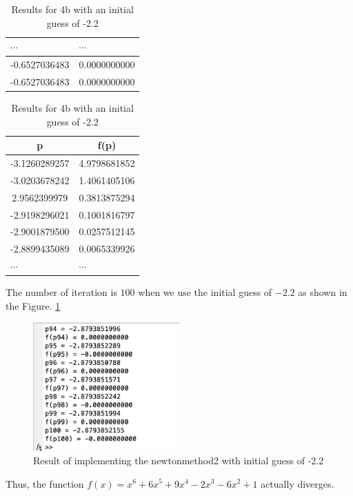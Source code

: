 \begin{answer}
\begin{table}[H]
{\begin{tabular}{c|c}
    \multicolumn{1}{l|}{$\cdots$}      & \multicolumn{1}{l}{$\cdots$}    \\ \hline
    \multicolumn{1}{l|}{-0.6527036483} & \multicolumn{1}{l}{0.0000000000} \\ \hline
    \multicolumn{1}{l|}{-0.6527036483} & \multicolumn{1}{l}{0.0000000000}
    \end{tabular}
    }
    \hfill
    \parbox{.45\linewidth}{
    \centering
    \caption{Results for 4b with an initial guess of -2.2}
    \label{tab:tab4}
    \begin{tabular}{c|c}
    \textbf{p}                         & \textbf{f(p)}                    \\ \hline
    -3.1260289257                      & 4.9798681852                     \\ \hline
    -3.0203678242                      & 1.4061405106                     \\ \hline
    2.9562399979                       & 0.3813875294                     \\ \hline
    -2.9198296021                      & 0.1001816797                     \\ \hline
    -2.9001879500                      & 0.0257512145                     \\ \hline
    \multicolumn{1}{l|}{-2.8899435089} & \multicolumn{1}{l}{0.0065339926} \\ \hline
    \multicolumn{1}{l|}{$\cdots$}      & \multicolumn{1}{l}{$\cdots$}               
    \end{tabular}
    }
    \end{table}
    The number of iteration is $100$ when we use the initial guess of $-2.2$ as shown in the Figure. \ref{fig:fig2}
    \begin{figure}[H]
        \centering
        \includegraphics[width=0.5\textwidth]{Figure 2.png}
        \caption{\label{fig:fig2}Result of implementing the newtonmethod2 with initial guess of -2.2}
    \end{figure}
    Thus, the function $f(x) = x^6+6x^5+9x^4-2x^3-6x^2 + 1$ actually diverges.
\end{answer}

